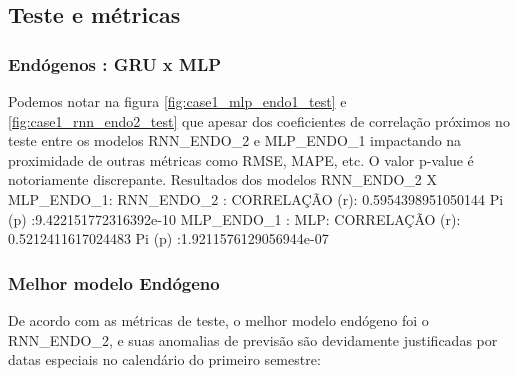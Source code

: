 \documentclass[	12pt, Times, openright, twoside, a4paper, english, brazil]{abntex2}
\begin{document}
        
    	\subsection{Teste e métricas}
    	    \subsubsection{Endógenos : GRU x MLP}
            Podemos notar na figura \ref{fig:case1_mlp_endo1_test} e \ref{fig:case1_rnn_endo2_test} que apesar dos coeficientes de correlação próximos no teste entre os modelos RNN\_ENDO\_2 e MLP\_ENDO\_1 impactando na proximidade de outras métricas como RMSE, MAPE, etc. O valor p-value é notoriamente discrepante.\newline
            Resultados dos modelos RNN\_ENDO\_2 X MLP\_ENDO\_1:\newline
            RNN\_ENDO\_2 : CORRELAÇÃO (r): 0.5954398951050144 Pi (p) :9.422151772316392e-10\newline
            MLP\_ENDO\_1 : MLP: CORRELAÇÃO (r): 0.5212411617024483 Pi (p) :1.9211576129056944e-07 \newline
            \begin{figure}[H]
            \end{figure}

            \begin{figure}[H]
            \end{figure}

    	    \subsubsection{Melhor modelo Endógeno}
            De acordo com as métricas de teste, o melhor modelo endógeno foi o RNN\_ENDO\_2, e suas anomalias de previsão são devidamente justificadas por datas especiais no calendário do primeiro semestre:
            
\end{document}
